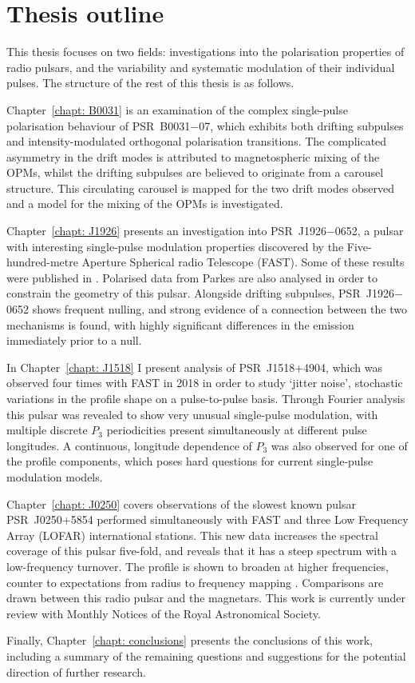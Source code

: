 \section{Thesis outline}
\label{sec: intro - thesis outline}

This thesis focuses on two fields: investigations into the polarisation properties of radio pulsars, and the variability and systematic modulation of their individual pulses. The structure of the rest of this thesis is as follows.

Chapter~\ref{chapt: B0031} is an examination of the complex single-pulse polarisation behaviour of PSR~B0031$-$07, which exhibits both drifting subpulses and intensity-modulated orthogonal polarisation transitions. The complicated asymmetry in the drift modes is attributed to magnetospheric mixing of the OPMs, whilst the drifting subpulses are believed to originate from a carousel structure. This circulating carousel is mapped for the two drift modes observed and a model for the mixing of the OPMs is investigated.

Chapter~\ref{chapt: J1926} presents an investigation into PSR~J1926$-$0652, a pulsar with interesting single-pulse modulation properties discovered by the Five-hundred-metre Aperture Spherical radio Telescope (FAST). Some of these results were published in \citet{ZLH+2019}. Polarised data from Parkes are also analysed in order to constrain the geometry of this pulsar. Alongside drifting subpulses, PSR~J1926$-$0652 shows frequent nulling, and strong evidence of a connection between the two mechanisms is found, with highly significant differences in the emission immediately prior to a null.

In Chapter~\ref{chapt: J1518} I present analysis of PSR~J1518+4904, which was observed four times with FAST in 2018 in order to study `jitter noise', stochastic variations in the profile shape on a pulse-to-pulse basis. Through Fourier analysis this pulsar was revealed to show very unusual single-pulse modulation, with multiple discrete $P_3$ periodicities present simultaneously at different pulse longitudes. A continuous, longitude dependence of $P_3$ was also observed for one of the profile components, which poses hard questions for current single-pulse modulation models.

Chapter~\ref{chapt: J0250} covers observations of the slowest known pulsar PSR~J0250+5854 \citep[$P_1 = 23.5$~s, ][]{TBC+2018} performed simultaneously with FAST and three Low Frequency Array (LOFAR) international stations. This new data increases the spectral coverage of this pulsar five-fold, and reveals that it has a steep spectrum with a low-frequency turnover. The profile is shown to broaden at higher frequencies, counter to expectations from radius to frequency mapping \citep[e.g.][]{KGxx2003}. Comparisons are drawn between this radio pulsar and the magnetars. This work is currently under review with Monthly Notices of the Royal Astronomical Society.


Finally, Chapter~\ref{chapt: conclusions} presents the conclusions of this work, including a summary of the remaining questions and suggestions for the potential direction of further research.